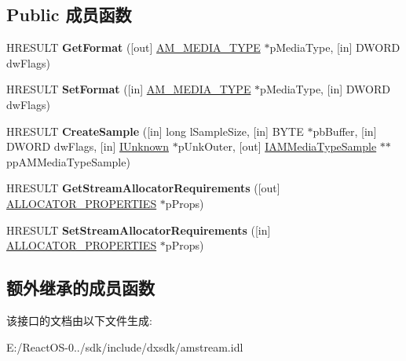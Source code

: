 \subsection*{Public 成员函数}
\begin{DoxyCompactItemize}
\item 
\mbox{\label{interface_i_a_m_media_type_stream_aa2c4864cff90822a3ac92b4087ed7c3f}} 
H\+R\+E\+S\+U\+LT {\bfseries Get\+Format} (\mbox{[}out\mbox{]} \hyperlink{struct_a_m___m_e_d_i_a___t_y_p_e}{A\+M\+\_\+\+M\+E\+D\+I\+A\+\_\+\+T\+Y\+PE} $\ast$p\+Media\+Type, \mbox{[}in\mbox{]} D\+W\+O\+RD dw\+Flags)
\item 
\mbox{\label{interface_i_a_m_media_type_stream_af3b933f01e2c51c032ea1030db1be994}} 
H\+R\+E\+S\+U\+LT {\bfseries Set\+Format} (\mbox{[}in\mbox{]} \hyperlink{struct_a_m___m_e_d_i_a___t_y_p_e}{A\+M\+\_\+\+M\+E\+D\+I\+A\+\_\+\+T\+Y\+PE} $\ast$p\+Media\+Type, \mbox{[}in\mbox{]} D\+W\+O\+RD dw\+Flags)
\item 
\mbox{\label{interface_i_a_m_media_type_stream_ac93bc824350e9a63ba4b5184ce4a29a9}} 
H\+R\+E\+S\+U\+LT {\bfseries Create\+Sample} (\mbox{[}in\mbox{]} long l\+Sample\+Size, \mbox{[}in\mbox{]} B\+Y\+TE $\ast$pb\+Buffer, \mbox{[}in\mbox{]} D\+W\+O\+RD dw\+Flags, \mbox{[}in\mbox{]} \hyperlink{interface_i_unknown}{I\+Unknown} $\ast$p\+Unk\+Outer, \mbox{[}out\mbox{]} \hyperlink{interface_i_a_m_media_type_sample}{I\+A\+M\+Media\+Type\+Sample} $\ast$$\ast$pp\+A\+M\+Media\+Type\+Sample)
\item 
\mbox{\label{interface_i_a_m_media_type_stream_aad2dee8ee494c77356f07055530de202}} 
H\+R\+E\+S\+U\+LT {\bfseries Get\+Stream\+Allocator\+Requirements} (\mbox{[}out\mbox{]} \hyperlink{struct___allocator_properties}{A\+L\+L\+O\+C\+A\+T\+O\+R\+\_\+\+P\+R\+O\+P\+E\+R\+T\+I\+ES} $\ast$p\+Props)
\item 
\mbox{\label{interface_i_a_m_media_type_stream_ad0e96d5a8aa0608e6dfaf4da0e2d4e20}} 
H\+R\+E\+S\+U\+LT {\bfseries Set\+Stream\+Allocator\+Requirements} (\mbox{[}in\mbox{]} \hyperlink{struct___allocator_properties}{A\+L\+L\+O\+C\+A\+T\+O\+R\+\_\+\+P\+R\+O\+P\+E\+R\+T\+I\+ES} $\ast$p\+Props)
\end{DoxyCompactItemize}
\subsection*{额外继承的成员函数}


该接口的文档由以下文件生成\+:\begin{DoxyCompactItemize}
\item 
E\+:/\+React\+O\+S-\/0../sdk/include/dxsdk/amstream.\+idl\end{DoxyCompactItemize}
